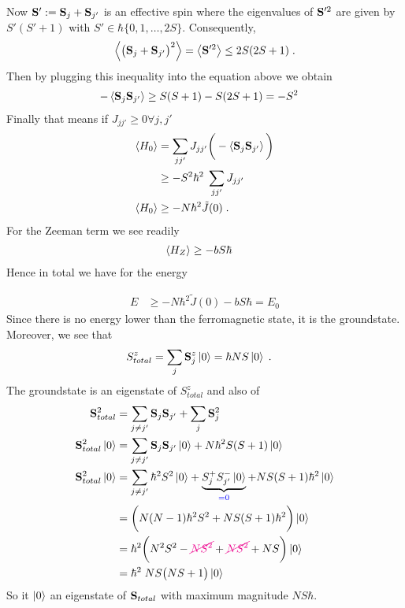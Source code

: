 Now $\mathbf S' :=\mathbf S_{j} + \mathbf S_{j'}$ is an effective spin where the eigenvalues of
$\mathbf S'^{2}$ are given by $S'(S'+1)$ with $S'\in \hbar \{0,1,\ldots,2 S\}$.
Consequently,
%
\begin{align*}
\left\langle\big( \mathbf S_{j} + \mathbf S_{j'} \big)^{2}\right\rangle  = \left\langle\mathbf S'^2\right\rangle \le 2S(2S+1)\;.
\end{align*}
%
Then by plugging this inequality into the equation above we obtain
%
\begin{align*}
- \left\langle\mathbf S_{j} \mathbf S_{j'}\right\rangle &\ge S(S+1) - S(2S+1) = - S^{2}
\end{align*}
%
Finally that means if $J_{jj'}\ge 0 \forall j,j'$
%
\begin{align*}
\left\langle H_{0}\right\rangle &= \sum_{jj'} J_{jj'} \bigg(-\left\langle\mathbf S_{j} \mathbf S_{j'}\right\rangle\bigg) \\
&\ge -S^{2}\hbar^{2}\;\sum_{jj'} J_{jj'}\\
\left\langle H_{0}\right\rangle &\ge - N \hbar^{2} \tilde J(0)\;.
\end{align*}
%
For the Zeeman term we see readily
%
\begin{align*}
\left\langle H_{Z}\right\rangle &\ge  - b S\hbar 
\end{align*}
%
Hence in total we have for the energy

%
\begin{align*}
E &\ge - N \hbar^{2} \tilde J(0) - b S\hbar = E_{0}
\end{align*}
%
Since there is no energy lower than the ferromagnetic state, it is the groundstate.
Moreover, we see that 
%
\begin{align*}
S^{z}_{total} &=\sum_{j} \mathbf S_{j}^{z}\ket{0} = \hbar NS \ket{0}\;.
\end{align*}
%
The groundstate is an eigenstate of $S^{z}_{total}$ and also of
%
\begin{align*}
\mathbf S_{total}^{2} &=\sum_{j\ne j'} \mathbf S_{j} \mathbf S_{j'} + \sum_{j} \mathbf S_{j}^{2}\\
\mathbf S_{total}^{2}\ket{0} &=\sum_{j\ne j'} \mathbf S_{j} \mathbf S_{j'} \ket{0} + N 
\hbar^{2}S(S+1)\ket{0}\\
\mathbf S_{total}^{2}\ket{0} &=\sum_{j\ne j'} \hbar^{2}S^{2} \ket{0} + \underbrace{
S_{j}^{+} S_{j'}^{-} \ket{0}
}_{\color{blue} = 0} + NS(S+1)\hbar^{2} \ket{0}\\
&=\bigg( N(N-1)\hbar^{2} S^{2} +  NS(S+1)\hbar^{2}\bigg)\ket{0}\\
&=\hbar^{2}\bigg( N^{2} S^{2} - {\color{magenta} \cancel{N  S^{2}}} +  {\color{magenta} \cancel{N S^{2}}} + NS \bigg)\ket{0}\\
&=\hbar^{2}\; N S\big(NS+1  \big) \ket{0}
\end{align*}
%
So it $\ket{0}$ an eigenstate of $\mathbf S_{total}$ with maximum magnitude $NS\hbar$.

